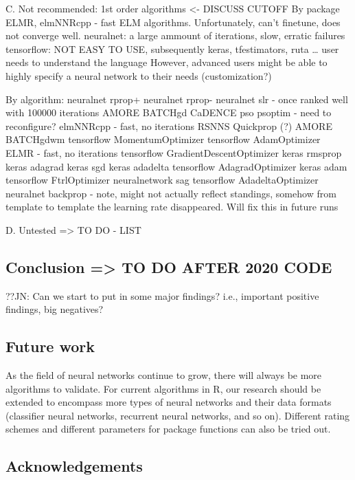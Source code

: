 C. Not recommended: 1st order algorithms \textless- DISCUSS CUTOFF By
package ELMR, elmNNRcpp - fast ELM algorithms. Unfortunately, can't
finetune, does not converge well. neuralnet: a large ammount of
iterations, slow, erratic failures tensorflow: NOT EASY TO USE,
subsequently keras, tfestimators, ruta \ldots{} user needs to understand
the language However, advanced users might be able to highly specify a
neural network to their needs (customization?)

By algorithm: neuralnet rprop+ neuralnet rprop- neuralnet slr - once
ranked well with 100000 iterations AMORE BATCHgd CaDENCE pso psoptim -
need to reconfigure? elmNNRcpp - fast, no iterations RSNNS Quickprop (?)
AMORE BATCHgdwm tensorflow MomentumOptimizer tensorflow AdamOptimizer
ELMR - fast, no iterations tensorflow GradientDescentOptimizer keras
rmsprop keras adagrad keras sgd keras adadelta tensorflow
AdagradOptimizer keras adam tensorflow FtrlOptimizer neuralnetwork sag
tensorflow AdadeltaOptimizer neuralnet backprop - note, might not
actually reflect standings, somehow from template to template the
learning rate disappeared. Will fix this in future runs

D. Untested =\textgreater{} TO DO - LIST

\hypertarget{conclusion-to-do-after-2020-code}{%
\subsection{Conclusion =\textgreater{} TO DO AFTER 2020
CODE}\label{conclusion-to-do-after-2020-code}}

??JN: Can we start to put in some major findings? i.e., important
positive findings, big negatives?

\hypertarget{future-work}{%
\subsection{Future work}\label{future-work}}

As the field of neural networks continue to grow, there will always be
more algorithms to validate. For current algorithms in R, our research
should be extended to encompass more types of neural networks and their
data formats (classifier neural networks, recurrent neural networks, and
so on). Different rating schemes and different parameters for package
functions can also be tried out.

\hypertarget{acknowledgements}{%
\subsection{Acknowledgements}\label{acknowledgements}}

